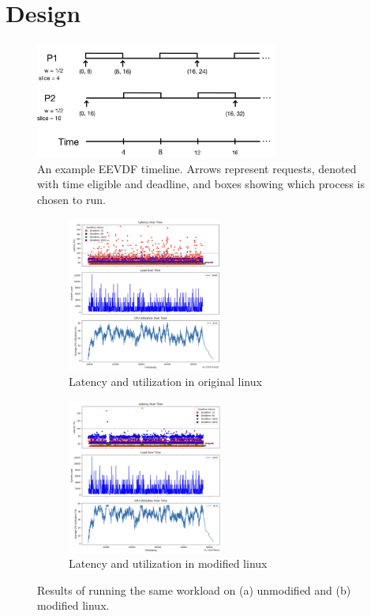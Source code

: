 \section{Design}

\begin{figure}[t!]
    \centering
    \includegraphics[height=1.5in]{img/eevdf.png}
    \caption{An example EEVDF timeline. Arrows represent requests, denoted with time eligible and deadline, 
        and boxes showing which process is chosen to run. }\label{eevdf}
\end{figure}

\begin{figure}[ht!]
    \centering
    \begin{subfigure}[t]{0.5\textwidth}
        \centering
        \includegraphics[height=2in]{img/old_lnx__2ms_wait__10K_iter.png}
        \caption{Latency and utilization in original linux}
    \end{subfigure}%
    \hfill
    \begin{subfigure}[t]{0.5\textwidth}
        \centering
        \includegraphics[height=2in]{img/new_lnx__2ms_wait__10K_iter.png}
        \caption{Latency and utilization in modified linux}
        \label{fig:graph:new}
    \end{subfigure}
    \vspace{10pt}
    \caption{Results of running the same workload on (a) unmodified and (b) modified linux.}
    \label{fig:graph}
\end{figure}

